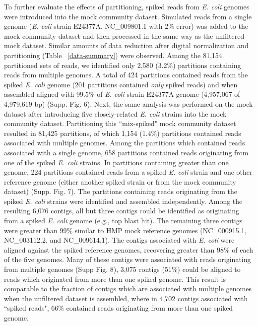 \documentclass[11pt]{article} %
\begin{document}
To further evaluate the effects of partitioning, spiked reads from
\emph{E. coli} genomes were introduced into the mock community
dataset. Simulated reads from a single genome (\emph{E. coli} strain E24377A,
NC\_009801.1 with 2\% error) was added to the mock community dataset
and then processed in the same way as the unfiltered mock dataset.  Similar
amounts of data reduction after digital normalization and partitioning
(Table ~\ref{data-summary}) were observed.  Among the 81,154
partitioned sets of reads, we identified only 2,580 (3.2\%) partitions
containing reads from multiple genomes.  A total of 424 partitions
contained reads from the spiked \emph{E. coli} genome (201 partitions
contained \emph{only} spiked reads) and when assembled aligned with
99.5\% of \emph{E. coli} strain E24377A genome (4,957,067 of 4,979,619
bp) (Supp. Fig. 6).  Next, the same analysis was performed on
the mock dataset after introducing five closely-related \emph{E. coli}
strains into the mock community dataset.  Partitioning this
``mix-spiked" mock community dataset resulted in 81,425 partitions, of
which 1,154 (1.4\%) partitions contained reads associated with multiple
genomes.  Among the partitions which contained reads associated with a
single genome, 658 partitions contained reads originating from one of
the spiked \emph{E. coli} strains.  In partitions containing greater
than one genome, 224 partitions contained reads from a spiked
\emph{E. coli} strain and one other reference genome (either another
spiked strain or from the mock community dataset)
(Supp. Fig. 7).  The partitions containing reads originating
from the spiked \emph{E. coli} strains were identified and assembled
independently.  Among the resulting 6,076 contigs, all but three
contigs could be identified as originating from a spiked
\emph{E. coli} genome (e.g., top blast hit).  The remaining three
contigs were greater than 99\% similar to HMP mock reference genomes
(NC\_000915.1, NC\_003112.2, and NC\_009614.1).  The contigs
associated with \emph{E. coli} were aligned against the spiked
reference genomes, recovering greater than 98\% of each of the five
genomes.  Many of these contigs were associated with reads originating
from multiple genomes (Supp Fig. 8), 3,075
contigs (51\%) could be aligned to reads which originated from more
than one spiked genome.  This result is comparable to the fraction of
contigs which are associated with multiple genomes when the unfiltered
dataset is assembled, where in 4,702 contigs associated with ``spiked
reads", 66\% contained reads originating from more than one spiked
genome.
\end{document}
